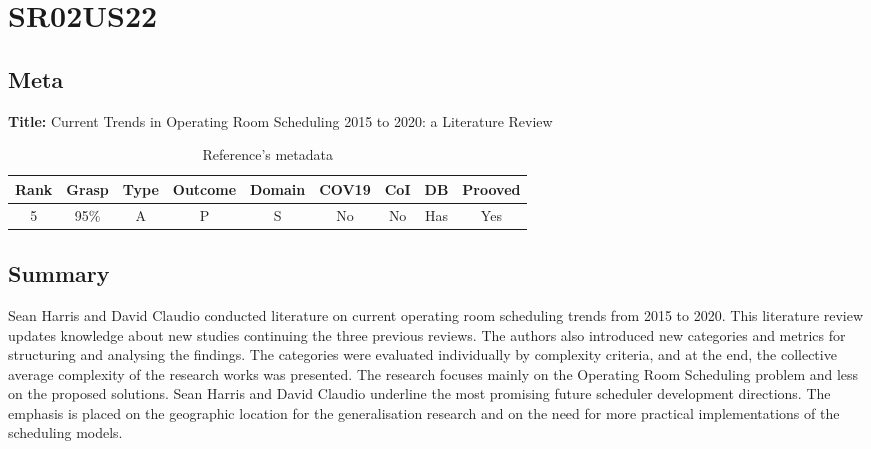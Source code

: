 \section{ SR02US22 }


\subsection{Meta}

    \textbf{Title:}
    Current Trends in Operating Room Scheduling 2015 to 2020: a Literature Review

    \begin{table}[H]
        \centering
        \begin{tabular}{|c|c|c|c|c|c|c|c|c|}
            \hline
                \textbf{Rank} & \textbf{Grasp} & \textbf{Type} & \textbf{Outcome} & \textbf{Domain} & \textbf{COV19} & \textbf{CoI} & \textbf{DB} & \textbf{Prooved} \\
            \hline
                5 & 95\% & A & P & S & No & No & Has & Yes \\
            \hline
        \end{tabular}
        \caption{Reference's metadata}
        \label{tab:SR02US22}
    \end{table}

\subsection{Summary}
Sean Harris and David Claudio \cite{x079} conducted literature on current operating room scheduling trends from 2015 to 2020. This literature review updates knowledge about new studies continuing the three previous reviews. The authors also introduced new categories and metrics for structuring and analysing the findings. The categories were evaluated individually by complexity criteria, and at the end, the collective average complexity of the research works was presented. The research focuses mainly on the Operating Room Scheduling problem and less on the proposed solutions. Sean Harris and David Claudio underline the most promising future scheduler development directions. The emphasis is placed on the geographic location for the generalisation research and on the need for more practical implementations of the scheduling models.


